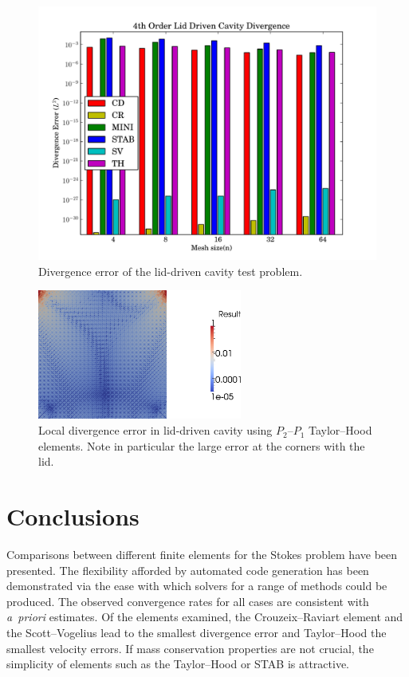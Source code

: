 \begin{figure}
  \center \includegraphics[width=\largefig]{chapters/terrel/pdf/div_4_test.pdf}
  \caption{Divergence error of the lid-driven cavity test problem.}
\label{fig:terrel:4th_Order_lid}
\end{figure}

\begin{figure}
  \center\includegraphics[width=0.6\textwidth]{chapters/terrel/png/lid_div_error.png}
  \caption{Local divergence error in lid-driven cavity using $P_2$--$P_1$
  Taylor--Hood elements. Note in particular the large error at the corners with
  the lid.}
  \label{fig:terrel:lid_div_error}
\end{figure}

\section{Conclusions}

Comparisons between different finite elements for the Stokes problem
have been presented. The flexibility afforded by automated code
generation has been demonstrated via the ease with which solvers for a
range of methods could be produced. The observed convergence rates for
all cases are consistent with \emph{a~priori} estimates. Of the
elements examined, the Crouzeix--Raviart element and the
Scott--Vogelius lead to the smallest divergence error and Taylor--Hood
the smallest velocity errors. If mass conservation properties are not
crucial, the simplicity of elements such as the Taylor--Hood or STAB
is attractive.
